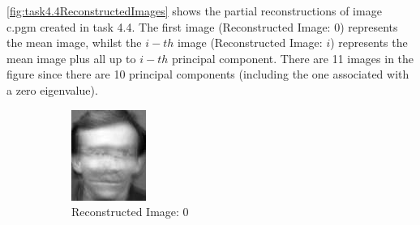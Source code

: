 \documentclass[12pt]{article}
\begin{document}
\cref{fig:task4.4ReconstructedImages} shows the partial reconstructions of image c.pgm created in task 4.4. The first image (Reconstructed Image: 0) represents the mean image, whilst the $i-th$ image (Reconstructed Image: $i$) represents the mean image plus all up to $i-th$ principal component. There are 11 images in the figure since there are 10 principal components (including the one associated with a zero eigenvalue).

\begin{figure}
	\centering
	\begin{subfigure}[b]{0.20\textwidth}
		\includegraphics[width=\textwidth]{Task4.3_Images/ReconstructedImage0.jpg}
		\caption{Reconstructed Image: 0}
	\end{subfigure}\quad
	\begin{subfigure}[b]{0.20\textwidth}

\end{subfigure}
\end{figure}
\end{document}
